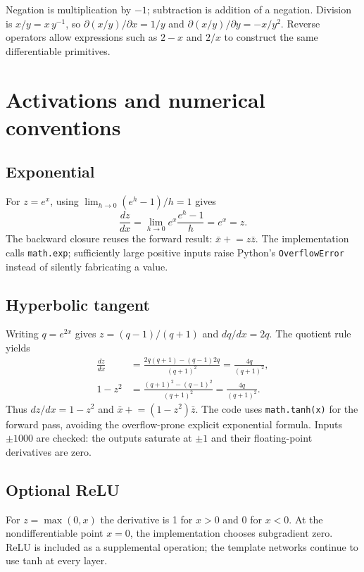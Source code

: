 \documentclass[11pt,a4paper]{article}
\newcommand{\code}[1]{\texttt{#1}}
\begin{document}
Negation is multiplication by $-1$; subtraction is addition of a negation.
Division is $x/y=x\,y^{-1}$, so
$\partial(x/y)/\partial x=1/y$ and
$\partial(x/y)/\partial y=-x/y^2$. Reverse operators allow expressions such
as $2-x$ and $2/x$ to construct the same differentiable primitives.
\clearpage

\section{Activations and numerical conventions}
\subsection{Exponential}
For $z=e^x$, using $\lim_{h\to0}(e^h-1)/h=1$ gives
\[
 \frac{dz}{dx}=\lim_{h\to0}e^x\frac{e^h-1}{h}=e^x=z.
\]
The backward closure reuses the forward result: $\bar x\mathrel{+}=z\bar z$.
The implementation calls \code{math.exp}; sufficiently large positive inputs
raise Python's \code{OverflowError} instead of silently fabricating a value.

\subsection{Hyperbolic tangent}
Writing $q=e^{2x}$ gives $z=(q-1)/(q+1)$ and $dq/dx=2q$. The quotient rule
yields
\begin{align*}
 \frac{dz}{dx}
 &=\frac{2q(q+1)-(q-1)2q}{(q+1)^2}
   =\frac{4q}{(q+1)^2},\\
 1-z^2
 &=\frac{(q+1)^2-(q-1)^2}{(q+1)^2}
   =\frac{4q}{(q+1)^2}.
\end{align*}
Thus $dz/dx=1-z^2$ and $\bar x\mathrel{+}=(1-z^2)\bar z$.
The code uses \code{math.tanh(x)} for the forward pass, avoiding the
overflow-prone explicit exponential formula. Inputs $\pm1000$ are checked:
the outputs saturate at $\pm1$ and their floating-point derivatives are zero.

\subsection{Optional ReLU}
For $z=\max(0,x)$ the derivative is 1 for $x>0$ and 0 for $x<0$.
At the nondifferentiable point $x=0$, the implementation chooses subgradient
zero. ReLU is included as a supplemental operation; the template networks
continue to use tanh at every layer.
\end{document}

